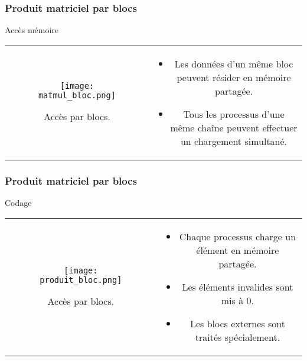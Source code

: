 \begin{frame}
    \frametitle{Produit matriciel par blocs}
\begin{block}{Accès mémoire}
   \begin{tabular}{cc}
        \begin{minipage}{0.45\textwidth}
 \begin{figure}[htbp]
    \centering
   \texttt{[image: matmul\_bloc.png]}
    \caption{Accès par blocs.}
    \label{fig:acces_matmul_bloc}
\end{figure}
        \end{minipage} & 
        \begin{minipage}{0.45\textwidth}
            \begin{itemize}
                \item<+-> Les données d'un même bloc peuvent résider en mémoire partagée.
                \item<+-> Tous les processus d'une même chaîne peuvent effectuer un chargement simultané.
           \end{itemize}
        \end{minipage}
\end{tabular}
\end{block}
\end{frame}
\begin{frame}
    \frametitle{Produit matriciel par blocs}
\begin{block}{Codage}
   \begin{tabular}{cc}
        \begin{minipage}{0.45\textwidth}
 \begin{figure}[htbp]
    \centering
   \texttt{[image: produit\_bloc.png]}
    \caption{Accès par blocs.}
    \label{fig:codage_produit_bloc}
\end{figure}
        \end{minipage} & 
        \begin{minipage}{0.45\textwidth}
            \begin{itemize}
                \item<+-> Chaque processus charge un élément en mémoire partagée.
                \item<+-> Les éléments invalides sont mis à 0.
                \item<+-> Les blocs externes sont traités spécialement.
           \end{itemize}
        \end{minipage}
\end{tabular}
\end{block}
\end{frame}

